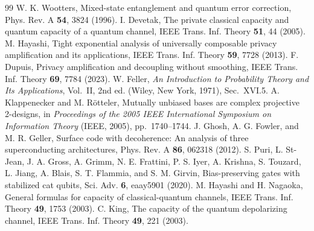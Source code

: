 \documentclass[aps,prl,reprint,superscriptaddress,amsmath,amssymb]{revtex4-2}
\begin{document}
\begin{thebibliography}{99}
W. K. Wootters, Mixed-state entanglement and quantum error correction,
Phys. Rev. A \textbf{54}, 3824 (1996).
 I. Devetak, The private classical capacity and quantum
capacity of a quantum channel, IEEE Trans. Inf. Theory \textbf{51}, 44 (2005).
 M. Hayashi, Tight exponential analysis of universally
composable privacy amplification and its applications,
IEEE Trans. Inf. Theory \textbf{59}, 7728 (2013).
 F. Dupuis, Privacy amplification and decoupling without
smoothing, IEEE Trans. Inf. Theory \textbf{69}, 7784 (2023).
 W. Feller, \emph{An Introduction to Probability Theory and
Its Applications}, Vol.~II, 2nd ed. (Wiley, New York, 1971), Sec.~XVI.5.
 A. Klappenecker and M. R\"otteler, Mutually unbiased bases
are complex projective 2-designs, in \emph{Proceedings of the 2005 IEEE
International Symposium on Information Theory} (IEEE, 2005), pp.~1740--1744.
 J. Ghosh, A. G. Fowler, and M. R. Geller, Surface code with
decoherence: An analysis of three superconducting architectures,
Phys. Rev. A \textbf{86}, 062318 (2012).
 S. Puri, L. St-Jean, J. A. Gross, A. Grimm, N. E. Frattini,
P. S. Iyer, A. Krishna, S. Touzard, L. Jiang, A. Blais, S. T. Flammia, and
S. M. Girvin, Bias-preserving gates with stabilized cat qubits, Sci. Adv.
\textbf{6}, eaay5901 (2020).
 M. Hayashi and H. Nagaoka, General formulas for
capacity of classical-quantum channels, IEEE Trans. Inf. Theory \textbf{49},
1753 (2003).
 C. King, The capacity of the quantum depolarizing channel,
IEEE Trans. Inf. Theory \textbf{49}, 221 (2003).
\end{thebibliography}
\end{document}
